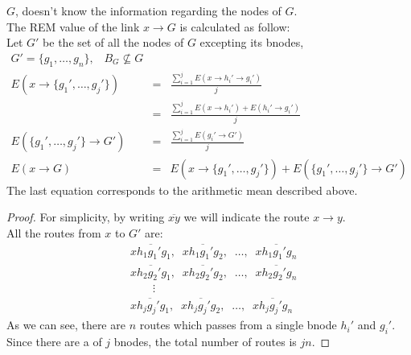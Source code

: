 \documentclass[a4paper]{article}
\begin{document}
\begin{enumerate}
		$G$,  doesn't know the information regarding the nodes of
		$G$.\\
		The REM value of the link $x\rightarrow G$ is calculated as
		follow:\\
		Let $G'$ be the set of all the nodes of $G$ excepting its
		bnodes,
		\begin{eqnarray*}
		G'=\{g_1,\dots,g_n\},\;\;\;B_G \nsubseteq G\\
		E(x \rightarrow \{g_1',\dots,g_j'\})&=&
				\frac{\sum_{i=1}^j E(x \rightarrow h_i' \rightarrow g_i')}
						{j}\\
				&=&
				\frac{\sum_{i=1}^j E(x \rightarrow
				h_i')+E(h_i' \rightarrow g_i')}{j}\\
		E(\{g_1',\dots,g_j'\}\rightarrow G')&=&
				\frac{\sum_{i=1}^j E(g_i'\rightarrow G')}{j}\\
		E(x\rightarrow G)&=&
			E(x \rightarrow \{g_1',\dots,g_j'\}) + E(\{g_1',\dots,g_j'\}\rightarrow G')
		\end{eqnarray*}
		The last equation corresponds to the arithmetic mean described
		above.
		\begin{proof}
			For simplicity, by writing $\overline{xy}$ we will indicate the route $x
			\rightarrow y$.\\
			All the routes from $x$ to $G'$ are:
			\begin{align*}
				&\overline{x h_1  g_1'  g_1},\;\; \overline{x
				h_1  g_1'g_2},\;\;\dots,\;\; \overline{x h_1
				g_1'  g_n}\\
				&\overline{x h_2  g_2'  g_1},\;\; \overline{x
				h_2  g_2'g_2},\;\;\dots,\;\; \overline{x h_2
				g_2'  g_n}\\
				&\qquad \vdots\\
				&\overline{x h_j  g_j'  g_1},\;\; \overline{x
				h_j  g_j'g_2},\;\;\dots,\;\; \overline{x h_j
				g_j'  g_n}
			\end{align*}
			As we can see, there are $n$ routes which passes from
			a single bnode $h_i'$ and $g_i'$. Since there are a
			of $j$ bnodes, the total number of routes is $jn$.


\end{proof}
\end{enumerate}
\end{document}
